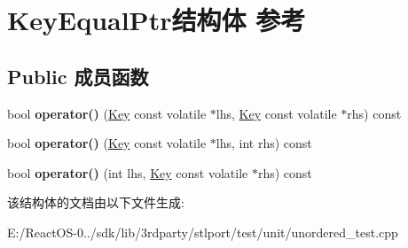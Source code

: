 \hypertarget{struct_key_equal_ptr}{}\section{Key\+Equal\+Ptr结构体 参考}
\label{struct_key_equal_ptr}
\subsection*{Public 成员函数}
\begin{DoxyCompactItemize}
\item 
\mbox{\label{struct_key_equal_ptr_ac82acb4691a7e1bfdd4b9f46723e8067}} 
bool {\bfseries operator()} (\hyperlink{struct_key}{Key} const volatile $\ast$lhs, \hyperlink{struct_key}{Key} const volatile $\ast$rhs) const
\item 
\mbox{\label{struct_key_equal_ptr_a2ce6996a99647dfad3a7b3de767d568d}} 
bool {\bfseries operator()} (\hyperlink{struct_key}{Key} const volatile $\ast$lhs, int rhs) const
\item 
\mbox{\label{struct_key_equal_ptr_a6253118b5b7ac46aa92acea1574eb9e8}} 
bool {\bfseries operator()} (int lhs, \hyperlink{struct_key}{Key} const volatile $\ast$rhs) const
\end{DoxyCompactItemize}


该结构体的文档由以下文件生成\+:\begin{DoxyCompactItemize}
\item 
E\+:/\+React\+O\+S-\/0../sdk/lib/3rdparty/stlport/test/unit/unordered\+\_\+test.\+cpp\end{DoxyCompactItemize}
